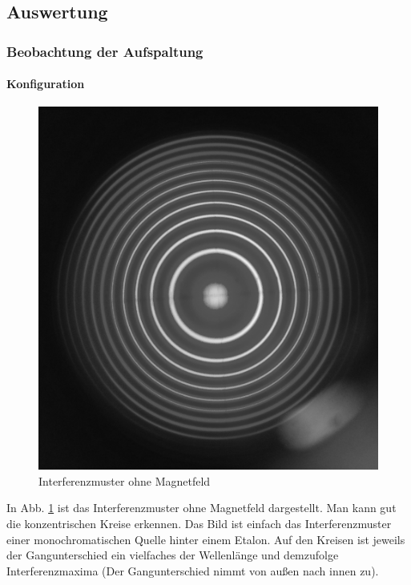 \newpage

\subsection{Auswertung}
\subsubsection{Beobachtung der Aufspaltung}
\paragraph{Konfiguration}
\begin{figure}
\centering
\includegraphics[scale=0.1]{data/bilder_okular/bild_1_edit.jpg}
\caption{Interferenzmuster ohne Magnetfeld}
\label{fig:bildtransohneB}
\end{figure}
In Abb. \ref{fig:bildtransohneB} ist das Interferenzmuster ohne Magnetfeld dargestellt. Man kann gut die konzentrischen Kreise erkennen. Das Bild ist einfach das Interferenzmuster einer monochromatischen Quelle hinter einem Etalon. Auf den Kreisen ist jeweils der Gangunterschied ein vielfaches der Wellenlänge und demzufolge Interferenzmaxima (Der Gangunterschied nimmt von außen nach innen zu).\\
